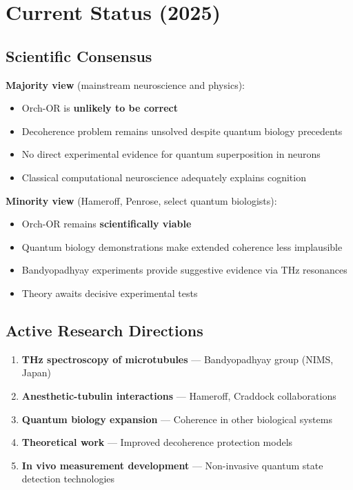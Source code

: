 \section{Current Status (2025)}

\subsection{Scientific Consensus}

\textbf{Majority view} (mainstream neuroscience and physics):
\begin{itemize}
\item Orch-OR is \textbf{unlikely to be correct}
\item Decoherence problem remains unsolved despite quantum biology precedents
\item No direct experimental evidence for quantum superposition in neurons
\item Classical computational neuroscience adequately explains cognition
\end{itemize}

\textbf{Minority view} (Hameroff, Penrose, select quantum biologists):
\begin{itemize}
\item Orch-OR remains \textbf{scientifically viable}
\item Quantum biology demonstrations make extended coherence less implausible
\item Bandyopadhyay experiments provide suggestive evidence via THz resonances
\item Theory awaits decisive experimental tests
\end{itemize}

\subsection{Active Research Directions}

\begin{enumerate}
\item \textbf{THz spectroscopy of microtubules} --- Bandyopadhyay group (NIMS, Japan)
\item \textbf{Anesthetic-tubulin interactions} --- Hameroff, Craddock collaborations
\item \textbf{Quantum biology expansion} --- Coherence in other biological systems
\item \textbf{Theoretical work} --- Improved decoherence protection models
\item \textbf{In vivo measurement development} --- Non-invasive quantum state detection technologies
\end{enumerate}

